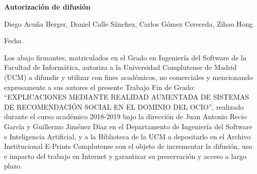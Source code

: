 
\newpage

\thispagestyle{empty}

\begin{center}

{\bf \Huge Autorización de difusión}

\vspace{1cm}


     Diego Acuña Berger, Daniel Calle Sánchez, Carlos Gómez Cereceda, Zihao Hong\\

   \vspace{0.5cm}


   Fecha\\

   \vspace{0.5cm}
   \end{center}
   
Los abajo firmantes, matriculados en el Grado en Ingeniería del Software de la Facultad de Informática, autoriza a la Universidad Complutense de Madrid (UCM) a difundir y utilizar con fines académicos, no comerciales y mencionando expresamente a sus autores el presente Trabajo Fin de Grado: “EXPLICACIONES MEDIANTE REALIDAD AUMENTADA DE SISTEMAS DE RECOMENDACIÓN SOCIAL EN EL DOMINIO DEL OCIO”, realizado durante el curso académico 2018-2019 bajo la dirección de Juan Antonio Recio García y Guillermo Jiménez Díaz en el Departamento de Ingeniería del Software e Inteligencia Artificial, y a la Biblioteca de la UCM a depositarlo en el Archivo Institucional E-Prints Complutense con el objeto de incrementar la difusión, uso e impacto del trabajo en Internet y garantizar su preservación y acceso a largo plazo.

